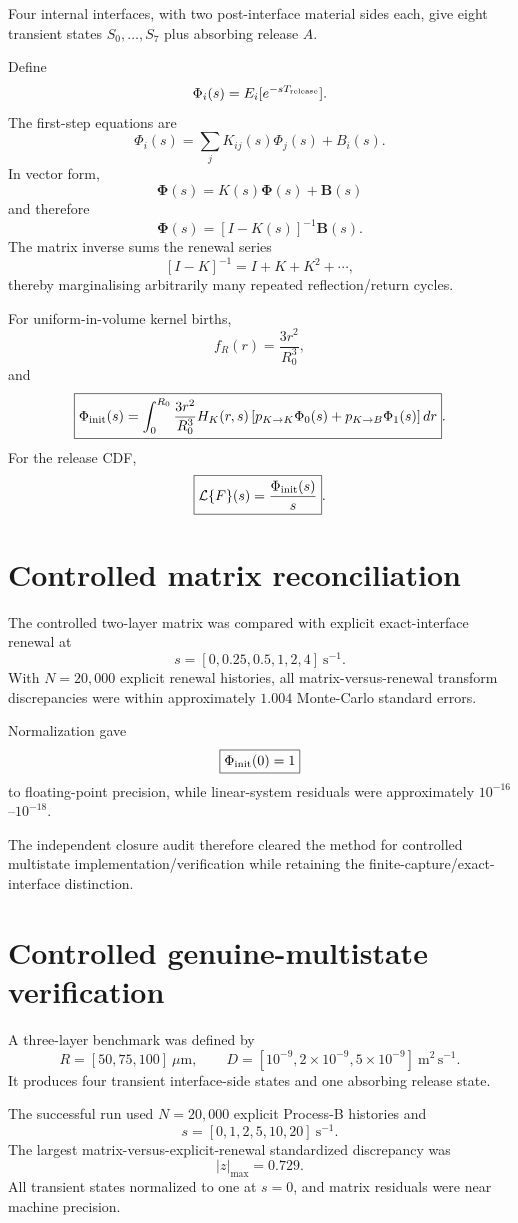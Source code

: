 \documentclass[11pt]{article}
\begin{document}
Four internal interfaces, with two post-interface material sides each, give eight transient states $S_0,\ldots,S_7$ plus absorbing release $A$.

Define
\[
\Phi_i(s)=E_i[e^{-sT_{\rm release}}].
\]
The first-step equations are
\[
\boxed{
\Phi_i(s)
=
\sum_jK_{ij}(s)\Phi_j(s)+B_i(s)
}.
\]
In vector form,
\[
\boxed{
\bm\Phi(s)
=
K(s)\bm\Phi(s)+\mathbf B(s)
}
\]
and therefore
\[
\boxed{
\bm\Phi(s)
=
[I-K(s)]^{-1}\mathbf B(s)
}.
\]
The matrix inverse sums the renewal series
\[
[I-K]^{-1}=I+K+K^2+\cdots,
\]
thereby marginalising arbitrarily many repeated reflection/return cycles.

For uniform-in-volume kernel births,
\[
f_R(r)=\frac{3r^2}{R_0^3},
\]
and
\[
\boxed{
\Phi_{\rm init}(s)
=
\int_0^{R_0}
\frac{3r^2}{R_0^3}
H_K(r,s)
\left[
p_{K\rightarrow K}\Phi_0(s)
+
p_{K\rightarrow B}\Phi_1(s)
\right]dr
}.
\]
For the release CDF,
\[
\boxed{
\mathcal L\{F\}(s)
=
\frac{\Phi_{\rm init}(s)}{s}
}.
\]

\section{Controlled matrix reconciliation}

The controlled two-layer matrix was compared with explicit exact-interface renewal at
\[
s=[0,0.25,0.5,1,2,4]\ \mathrm{s^{-1}}.
\]
With $N=20{,}000$ explicit renewal histories, all matrix-versus-renewal transform discrepancies were within approximately $1.004$ Monte-Carlo standard errors.

Normalization gave
\[
\boxed{\Phi_{\rm init}(0)=1}
\]
to floating-point precision, while linear-system residuals were approximately $10^{-16}$--$10^{-18}$.

The independent closure audit therefore cleared the method for controlled multistate implementation/verification while retaining the finite-capture/exact-interface distinction.

\section{Controlled genuine-multistate verification}

A three-layer benchmark was defined by
\[
R=[50,75,100]\ \mu\mathrm m,
\qquad
D=[10^{-9},2\times10^{-9},5\times10^{-9}]\ \mathrm{m^2\,s^{-1}}.
\]
It produces four transient interface-side states and one absorbing release state.

The successful run used $N=20{,}000$ explicit Process-B histories and
\[
s=[0,1,2,5,10,20]\ \mathrm{s^{-1}}.
\]
The largest matrix-versus-explicit-renewal standardized discrepancy was
\[
\boxed{|z|_{\max}=0.729}.
\]
All transient states normalized to one at $s=0$, and matrix residuals were near machine precision.
\end{document}
